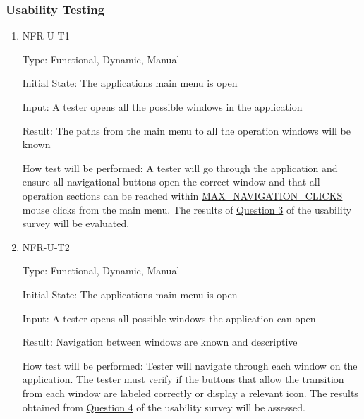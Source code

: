 \documentclass[12pt, titlepage]{article}
\begin{document}
\subsubsection{Usability Testing}
\begin{enumerate}

\item{NFR-U-T1\\}

Type: Functional, Dynamic, Manual 
					
Initial State: The applications main menu is open
					
Input: A tester opens all the possible windows in the application
					
Result: The paths from the main menu to all the operation windows will be known
					
How test will be performed: A tester will go through the application and ensure all navigational buttons open the correct window and that all operation sections can be reached within \hyperref[sec:sp]{MAX\_NAVIGATION\_CLICKS} mouse clicks from the main menu. The results of \hyperref[sec:survey]{Question 3} of the usability survey will be evaluated.

\item{NFR-U-T2\\}

Type: Functional, Dynamic, Manual
					
Initial State: The applications main menu is open
					
Input: A tester opens all possible windows the application can open
					
Result: Navigation between windows are known and descriptive
					
How test will be performed: Tester will navigate through each window on the application. The tester must verify if the buttons that allow the transition from each window are labeled correctly or display a relevant icon. The results obtained from \hyperref[sec:survey]{Question 4} of the usability survey will be assessed.


\end{enumerate}
\end{document}

